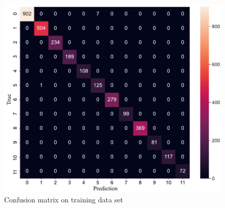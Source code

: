 \begin{landscape}
\begin{minipage}{.715\textwidth}
\begin{figure}[H]
    \includegraphics[width=\textwidth]{evaluation/imgs/5-confusion_matrix_train.pdf}
    \caption{Confusion matrix on training data set}
    \label{fig:5-confusion_matrix_train}
\end{figure}
\end{minipage}
\end{landscape}
